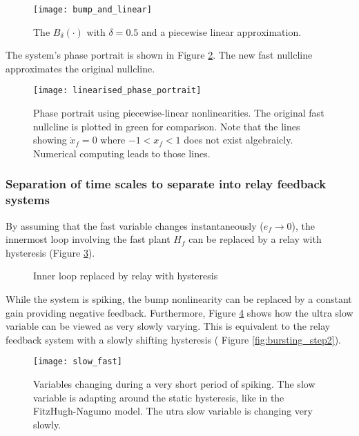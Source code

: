 \documentclass[a4paper, 12pt]{article}
\begin{document}
\begin{figure}
\texttt{[image: bump\_and\_linear]}
\caption{The $B_\delta(\cdot)$ with $\delta = 0.5$ and a piecewise linear approximation.}
\label{fig:bump_linear}
\end{figure}

The system's phase portrait is shown in Figure \ref{fig:linearised_phase_portrait}. The new fast nullcline approximates the original nullcline. 

\begin{figure}
\texttt{[image: linearised\_phase\_portrait]}
\caption{Phase portrait using piecewise-linear nonlinearities. The original fast nullcline is plotted in green for comparison. Note that the lines showing $\dot{x}_f=0$ where $-1<x_f<1$ does not exist algebraicly. Numerical computing leads to those lines.}
\label{fig:linearised_phase_portrait}
\end{figure}

\subsubsection{Separation of time scales to separate into relay feedback systems}
By assuming that the fast variable changes instantaneously ($e_f\rightarrow0$), the innermost loop involving the fast plant $H_f$ can be replaced by a relay with hysteresis (Figure \ref{fig:bursting_step1}). 

\begin{figure}
\caption{Inner loop replaced by relay with hysteresis}
\label{fig:bursting_step1}
\end{figure}

While the system is spiking, the bump nonlinearity can be replaced by a constant gain providing negative feedback. Furthermore, Figure \ref{fig:bursting_step2.1} shows how the ultra slow variable can be viewed as very slowly varying. This is equivalent to the relay feedback system with a slowly shifting hysteresis ( Figure \ref{fig:bursting_step2}). 

\begin{figure}
\texttt{[image: slow\_fast]}
\caption{Variables changing during a very short period of spiking. The slow variable is adapting around the static hysteresis, like in the FitzHugh-Nagumo model. The utra slow variable is changing very slowly.}
\label{fig:bursting_step2.1}
\end{figure}
\end{document}
